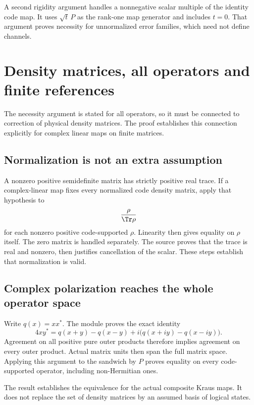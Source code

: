A second rigidity argument handles a nonnegative scalar multiple of the identity code map. It uses $\sqrt t\,P$ as the rank-one map generator and includes $t=0$. That argument proves necessity for unnormalized error families, which need not define channels.



\section{Density matrices, all operators and finite references}\label{supp5:section:004}
The necessity argument is stated for all operators, so it must be connected to correction of physical density matrices. The proof establishes this connection explicitly for complex linear maps on finite matrices.

\subsection{Normalization is not an extra assumption}
A nonzero positive semidefinite matrix has strictly positive real trace. If a complex-linear map fixes every normalized code density matrix, apply that hypothesis to
\[
\frac{\rho}{\Tr\rho}
\]
for each nonzero positive code-supported $\rho$. Linearity then gives equality on $\rho$ itself. The zero matrix is handled separately. The source proves that the trace is real and nonzero, then justifies cancellation of the scalar. These steps establish that normalization is valid.

\subsection{Complex polarization reaches the whole operator space}
Write $q(x)=xx^*$. The module proves the exact identity
\[
4xy^*=q(x+y)-q(x-y)
+i\bigl(q(x+iy)-q(x-iy)\bigr).
\]
Agreement on all positive pure outer products therefore implies agreement on every outer product. Actual matrix units then span the full matrix space. Applying this argument to the sandwich by $P$ proves equality on every code-supported operator, including non-Hermitian ones.

The result  establishes the equivalence for the actual composite Kraus maps. It does not replace the set of density matrices by an assumed basis of logical states.

